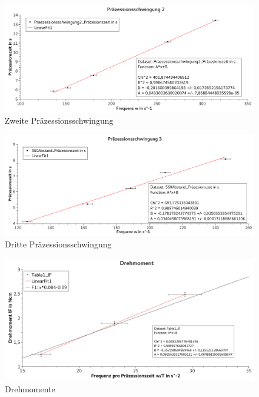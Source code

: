 \documentclass[
	a4paper,
	12pt,
	pagesize,
	ngerman
]{scrartcl}
\begin{document}
	\begin{figure}[tb]
		\includegraphics[width=1\textwidth]{Praez2}
		\centering
		\caption{Zweite Präzessionsschwingung}
		\label{Praez2}
		\centering
	\end{figure}

	\begin{figure}[tb]
		\includegraphics[width=1\textwidth]{Praez3}
		\centering
		\caption{Dritte Präzessionsschwingung}
		\label{Praez3}
		\centering
	\end{figure}

	\begin{figure}[tb]
		\includegraphics[width=1\textwidth]{Drehmoment}
		\centering
		\caption{Drehmomente} %
		\label{Drehmoment}
		\centering
	\end{figure}
\end{document}
